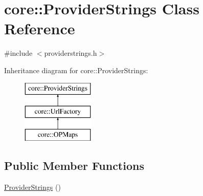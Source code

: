 \hypertarget{classcore_1_1_provider_strings}{\section{core\-:\-:\-Provider\-Strings \-Class \-Reference}
\label{classcore_1_1_provider_strings}
}


{\ttfamily \#include $<$providerstrings.\-h$>$}

\-Inheritance diagram for core\-:\-:\-Provider\-Strings\-:\begin{figure}[H]
\begin{center}
\leavevmode
\includegraphics[height=3.000000cm]{classcore_1_1_provider_strings}
\end{center}
\end{figure}
\subsection*{\-Public \-Member \-Functions}
\begin{DoxyCompactItemize}
\item 
\hyperlink{group___o_p_map_widget_ga1ecf05c742cf2e3d35cffadb55e73ba2}{\-Provider\-Strings} ()
\end{DoxyCompactItemize}
